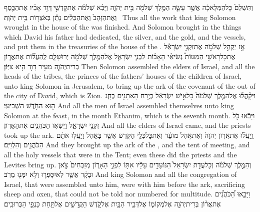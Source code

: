 \setcounter{chap}{7}
\setcounter{verse}{51}
{וַתִּשְׁלַם֙ כׇּל\maqqaf הַמְּלָאכָ֔ה אֲשֶׁ֥ר עָשָׂ֛ה הַמֶּ֥לֶךְ שְׁלֹמֹ֖ה בֵּ֣ית יְהֹוָ֑ה וַיָּבֵ֨א שְׁלֹמֹ֜ה אֶת\maqqaf קׇדְשֵׁ֣י \legarmeh  דָּוִ֣ד אָבִ֗יו אֶת\maqqaf הַכֶּ֤סֶף וְאֶת\maqqaf הַזָּהָב֙ וְאֶת\maqqaf הַכֵּלִ֔ים נָתַ֕ן בְּאֹצְר֖וֹת בֵּ֥ית יְהֹוָֽה׃ \petucha }
{Thus all the work that king Solomon wrought in the house of the \lord\space was finished. And Solomon brought in the things which David his father had dedicated, the silver, and the gold, and the vessels, and put them in the treasuries of the house of the \lord.}
\newperek
{}
{אָ֣ז יַקְהֵ֣ל שְׁלֹמֹ֣ה אֶת\maqqaf זִקְנֵ֣י יִשְׂרָאֵ֡ל אֶת\maqqaf כׇּל\maqqaf רָאשֵׁ֣י הַמַּטּוֹת֩ נְשִׂיאֵ֨י הָאָב֜וֹת לִבְנֵ֧י יִשְׂרָאֵ֛ל אֶל\maqqaf הַמֶּ֥לֶךְ שְׁלֹמֹ֖ה יְרוּשָׁלָ֑͏ִם לְֽהַעֲל֞וֹת אֶת\maqqaf אֲר֧וֹן בְּרִית\maqqaf יְהֹוָ֛ה מֵעִ֥יר דָּוִ֖ד הִ֥יא צִיּֽוֹן׃}
{Then Solomon assembled the elders of Israel, and all the heads of the tribes, the princes of the fathers’ houses of the children of Israel, unto king Solomon in Jerusalem, to bring up the ark of the covenant of the \lord\space out of the city of David, which is Zion.}
{וַיִּקָּ֨הֲל֜וּ אֶל\maqqaf הַמֶּ֤לֶךְ שְׁלֹמֹה֙ כׇּל\maqqaf אִ֣ישׁ יִשְׂרָאֵ֔ל בְּיֶ֥רַח הָאֵתָנִ֖ים בֶּחָ֑ג ה֖וּא הַחֹ֥דֶשׁ הַשְּׁבִיעִֽי׃}
{And all the men of Israel assembled themselves unto king Solomon at the feast, in the month Ethanim, which is the seventh month.}
{וַיָּבֹ֕אוּ כֹּ֖ל זִקְנֵ֣י יִשְׂרָאֵ֑ל וַיִּשְׂא֥וּ הַכֹּהֲנִ֖ים אֶת\maqqaf הָאָרֽוֹן׃}
{And all the elders of Israel came, and the priests took up the ark.}
{וַֽיַּעֲל֞וּ אֶת\maqqaf אֲר֤וֹן יְהֹוָה֙ וְאֶת\maqqaf אֹ֣הֶל מוֹעֵ֔ד וְאֶת\maqqaf כׇּל\maqqaf כְּלֵ֥י הַקֹּ֖דֶשׁ אֲשֶׁ֣ר בָּאֹ֑הֶל וַיַּעֲל֣וּ אֹתָ֔ם הַכֹּהֲנִ֖ים וְהַלְוִיִּֽם׃}
{And they brought up the ark of the \lord, and the tent of meeting, and all the holy vessels that were in the Tent; even these did the priests and the Levites bring up.}
{וְהַמֶּ֣לֶךְ שְׁלֹמֹ֗ה וְכׇל\maqqaf עֲדַ֤ת יִשְׂרָאֵל֙ הַנּוֹעָדִ֣ים עָלָ֔יו אִתּ֖וֹ לִפְנֵ֣י הָאָר֑וֹן מְזַבְּחִים֙ צֹ֣אן וּבָקָ֔ר אֲשֶׁ֧ר לֹֽא\maqqaf יִסָּפְר֛וּ וְלֹ֥א יִמָּנ֖וּ מֵרֹֽב׃}
{And king Solomon and all the congregation of Israel, that were assembled unto him, were with him before the ark, sacrificing sheep and oxen, that could not be told nor numbered for multitude.}
{וַיָּבִ֣אוּ הַ֠כֹּהֲנִ֠ים אֶת\maqqaf אֲר֨וֹן בְּרִית\maqqaf יְהֹוָ֧ה אֶל\maqqaf מְקוֹמ֛וֹ אֶל\maqqaf דְּבִ֥יר הַבַּ֖יִת אֶל\maqqaf קֹ֣דֶשׁ הַקֳּדָשִׁ֑ים אֶל\maqqaf תַּ֖חַת כַּנְפֵ֥י הַכְּרוּבִֽים׃}
